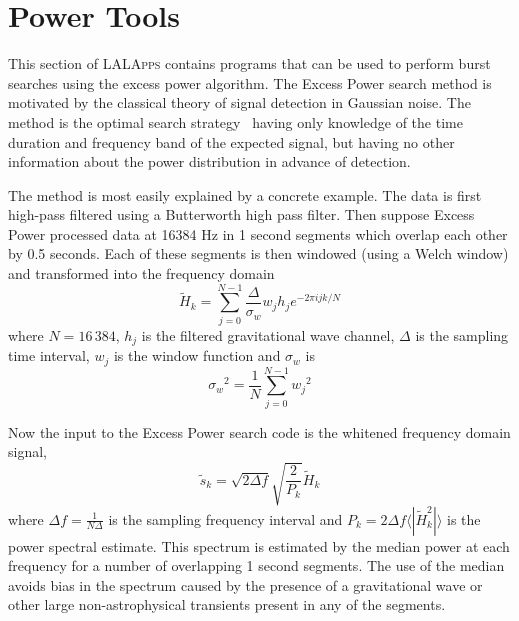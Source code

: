 
\clearpage

\section{Power Tools}
\label{section:powertools}

This section of \textsc{LALApps} contains programs that can be used to
perform burst searches using the excess power algorithm.   
The Excess Power search method is motivated by the classical theory of
signal detection in Gaussian noise.  The method is the optimal search
strategy~\cite{Anderson:2000yy} having only knowledge of the time duration
and frequency band of the expected signal,  but having no other
information about the power distribution in advance of detection. 

The method is most easily explained by a concrete example.
The data is first high-pass filtered using a Butterworth high pass filter.
Then suppose Excess Power processed data at 16384 Hz in 1 second segments 
which overlap each other by 0.5 seconds. Each of these segments is then 
windowed (using a Welch window) and transformed into the frequency domain 
\begin{equation}
\tilde{H}_k =  \sum_{j=0}^{N-1}\frac{\Delta}{\sigma_w}w_jh_j e^{-2 \pi i j k /N}
\end{equation}
where $N=16\, 384$, $h_j$ is the filtered gravitational 
wave channel, $\Delta$ is the sampling time interval, $w_j$ is the window
function and $\sigma_w$ is  
\begin{equation}
{\sigma_w}^2 = \frac{1}{N}\sum_{j=0}^{N-1}{w_j}^2
\end{equation}

Now the input to the Excess Power search code is the whitened 
frequency domain signal,
\begin{equation}
\tilde{s}_k = \sqrt{2\Delta f}\sqrt{\frac{2}{P_k}}\tilde{H}_k
\end{equation}
where $\Delta f = \frac{1}{N\Delta}$ is the sampling frequency interval and 
$P_k = 2 \Delta f\langle|\tilde{H}_k^2| \rangle$ is the 
power spectral estimate.  This spectrum is estimated by the median
power at each frequency for a number of overlapping 1 second segments.
The use of the median avoids bias in the spectrum caused by the
presence of a gravitational wave or other large non-astrophysical
transients present in any of the segments.   

